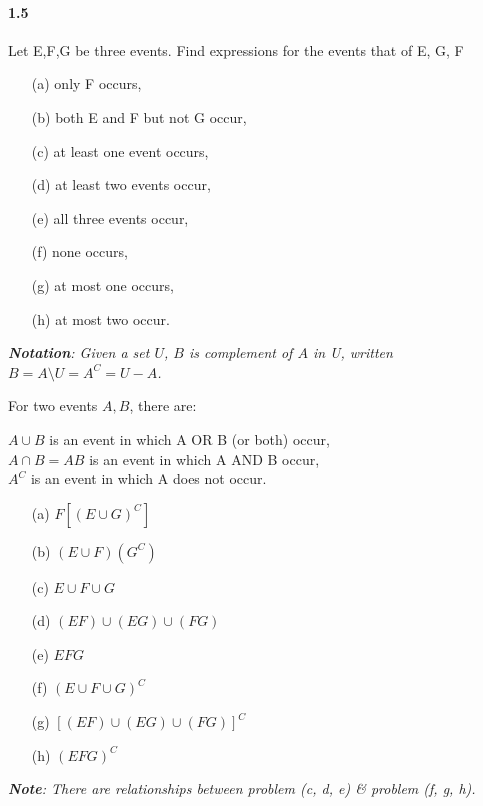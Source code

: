 \paragraph{1.5}
Let E,F,G be three events. Find expressions for the events that of E, G, F
\begin{itemize}
    \item[(a)] only F occurs,
    \item[(b)] both E and F but not G occur,
    \item[(c)] at least one event occurs,
    \item[(d)] at least two events occur,
    \item[(e)] all three events occur,
    \item[(f)] none occurs,
    \item[(g)] at most one occurs,
    \item[(h)] at most two occur.
\end{itemize}

\noindent \textit{\textbf{Notation}: Given a set $U$, $B$ is complement of $A$ in U, written $B = A \setminus U = A^C = U - A$.}

\solution

For two events $A, B$, there are:

\begin{center}
    $A\cup B$ is an event in which A OR B (or both) occur,\\
    $A\cap B = AB$ is an event in which A AND B occur,\\
    $A^C$ is an event in which A does not occur.
\end{center}

\begin{itemize}
    \item[(a)] $F[(E\cup G)^C]$
    \item[(b)] $(E\cup F)(G^C)$
    \item[(c)] $E\cup F\cup G$
    \item[(d)] $(EF)\cup (EG)\cup (FG)$
    \item[(e)] $EFG$
    \item[(f)] $(E\cup F\cup G)^C$
    \item[(g)] $[(EF)\cup (EG)\cup (FG)]^C$
    \item[(h)] $(EFG)^C$
\end{itemize}

\textit{\textbf{Note}: There are relationships between problem (c, d, e) \& problem (f, g, h).}

